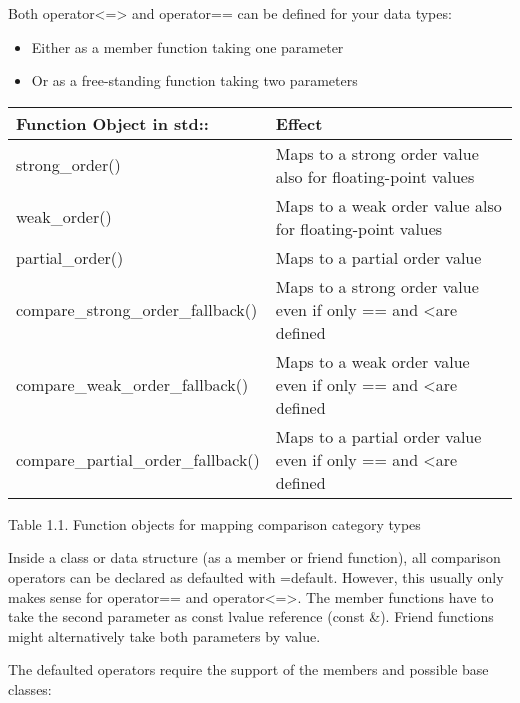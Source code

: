 

Both operator<=> and operator== can be defined for your data types:

\begin{itemize}
\item
Either as a member function taking one parameter

\item
Or as a free-standing function taking two parameters
\end{itemize}


\begin{longtable}[c]{|l|l|}
\hline
\textbf{Function Object in std::} & \textbf{Effect}                                             \\ \hline
\endfirsthead
%
\endhead
%
strong\_order()                   & Maps to a strong order value also for floating-point values \\ \hline
weak\_order()                     & Maps to a weak order value also for floating-point values   \\ \hline
partial\_order()                  & Maps to a partial order value                               \\ \hline
compare\_strong\_order\_fallback()  & Maps to a strong order value even if only == and \textless are defined  \\ \hline
compare\_weak\_order\_fallback()    & Maps to a weak order value even if only == and \textless are defined    \\ \hline
compare\_partial\_order\_fallback() & Maps to a partial order value even if only == and \textless are defined \\ \hline
\end{longtable}

\begin{center}
Table 1.1. Function objects for mapping comparison category types
\end{center}



Inside a class or data structure (as a member or friend function), all comparison operators can be declared as defaulted with =default. However, this usually only makes sense for operator== and operator<=>. The member functions have to take the second parameter as const lvalue reference (const \&). Friend functions might alternatively take both parameters by value.

The defaulted operators require the support of the members and possible base classes:

